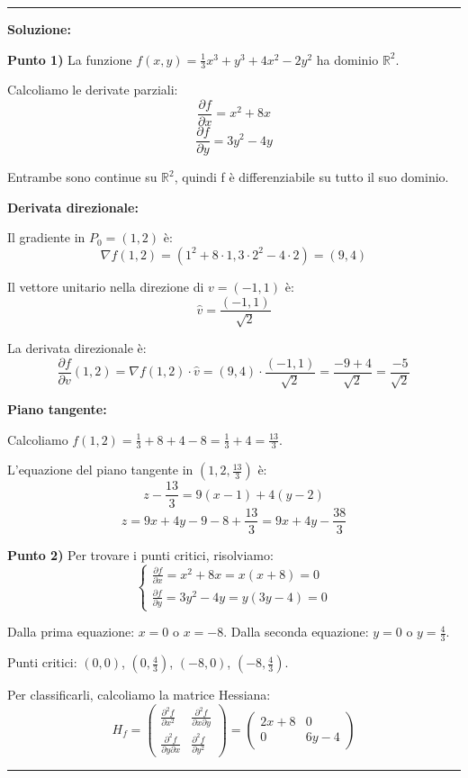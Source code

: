 \documentclass[12pt, a4paper]{article}
\newenvironment{solution}
{\par\noindent\rule{\textwidth}{0.4pt}\par\textbf{Soluzione:}\medskip\par}
{\par\rule{\textwidth}{0.4pt}\par\bigskip}
\begin{document}
\begin{solution}
\textbf{Punto 1)} La funzione $f(x,y) = \frac{1}{3}x^{3} + y^{3} + 4x^{2} - 2y^{2}$ ha dominio $\mathbb{R}^2$.

Calcoliamo le derivate parziali:
\[
\frac{\partial f}{\partial x} = x^2 + 8x
\]
\[
\frac{\partial f}{\partial y} = 3y^2 - 4y
\]

Entrambe sono continue su $\mathbb{R}^2$, quindi f è differenziabile su tutto il suo dominio.

\textbf{Derivata direzionale:}

Il gradiente in $P_0 = (1,2)$ è:
\[
\nabla f(1,2) = (1^2 + 8 \cdot 1, 3 \cdot 2^2 - 4 \cdot 2) = (9, 4)
\]

Il vettore unitario nella direzione di $v = (-1,1)$ è:
\[
\hat{v} = \frac{(-1,1)}{\sqrt{2}}
\]

La derivata direzionale è:
\[
\frac{\partial f}{\partial v}(1,2) = \nabla f(1,2) \cdot \hat{v} = (9,4) \cdot \frac{(-1,1)}{\sqrt{2}} = \frac{-9+4}{\sqrt{2}} = \frac{-5}{\sqrt{2}}
\]

\textbf{Piano tangente:}

Calcoliamo $f(1,2) = \frac{1}{3} + 8 + 4 - 8 = \frac{1}{3} + 4 = \frac{13}{3}$.

L'equazione del piano tangente in $(1,2,\frac{13}{3})$ è:
\[
z - \frac{13}{3} = 9(x-1) + 4(y-2)
\]
\[
z = 9x + 4y - 9 - 8 + \frac{13}{3} = 9x + 4y - \frac{38}{3}
\]

\vspace{0.5cm}

\textbf{Punto 2)} Per trovare i punti critici, risolviamo:
\[
\begin{cases}
\frac{\partial f}{\partial x} = x^2 + 8x = x(x+8) = 0 \\
\frac{\partial f}{\partial y} = 3y^2 - 4y = y(3y-4) = 0
\end{cases}
\]

Dalla prima equazione: $x = 0$ o $x = -8$.
Dalla seconda equazione: $y = 0$ o $y = \frac{4}{3}$.

Punti critici: $(0,0)$, $(0,\frac{4}{3})$, $(-8,0)$, $(-8,\frac{4}{3})$.

Per classificarli, calcoliamo la matrice Hessiana:
\[
H_f = \begin{pmatrix}
\frac{\partial^2 f}{\partial x^2} & \frac{\partial^2 f}{\partial x \partial y} \\
\frac{\partial^2 f}{\partial y \partial x} & \frac{\partial^2 f}{\partial y^2}
\end{pmatrix} = \begin{pmatrix}
2x + 8 & 0 \\
0 & 6y - 4
\end{pmatrix}
\]


\end{solution}
\end{document}
